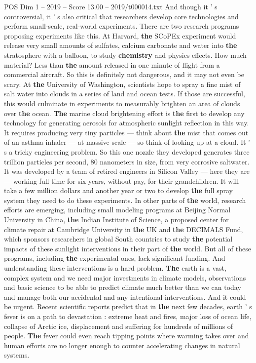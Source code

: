 \begin{textsample}{POS Dim 1 – 2019 – Score 13.00 – 2019/t000014.txt}
And though it ' s controversial, it ' s also critical that researchers develop core technologies and perform small-scale, real-world experiments.
There are two research programs proposing experiments like this.
At Harvard, \textbf{the} SCoPEx experiment would release very small amounts of sulfates, calcium carbonate and water into \textbf{the} stratosphere with a balloon, to study \textbf{chemistry} and physics effects.
How much material?
Less than \textbf{the} amount released in one minute of flight from a commercial aircraft.
So this is definitely not dangerous, and it may not even be scary.
At \textbf{the} University of Washington, scientists hope to spray a fine mist of salt water into clouds in a series of land and ocean tests.
If those are successful, this would culminate in experiments to measurably brighten an area of clouds over \textbf{the} ocean. \textbf{The} marine cloud brightening effort is \textbf{the} first to develop any technology for generating aerosols for atmospheric sunlight reflection in this way.
It requires producing very tiny particles — think about \textbf{the} mist that comes out of an asthma inhaler — at massive scale — so think of looking up at a cloud.
It ' s a tricky engineering problem.
So this one nozzle they developed generates three trillion particles per second, 80 nanometers in size, from very corrosive saltwater.
It was developed by a team of retired engineers in Silicon Valley — here they are — working full-time for six years, without pay, for their grandchildren.
It will take a few million dollars and another year or two to develop \textbf{the} full spray system they need to do these experiments.
In other parts of \textbf{the} world, research efforts are emerging, including small modeling programs at Beijing Normal University in China, \textbf{the} Indian Institute of Science, a proposed center for climate repair at Cambridge University in \textbf{the} UK and \textbf{the} DECIMALS Fund, which sponsors researchers in global South countries to study \textbf{the} potential impacts of these sunlight interventions in their part of \textbf{the} world.
But all of these programs, including \textbf{the} experimental ones, lack significant funding.
And understanding these interventions is a hard problem. \textbf{The} earth is a vast, complex system and we need major investments in climate models, observations and basic science to be able to predict climate much better than we can today and manage both our accidental and any intentional interventions.
And it could be urgent.
Recent scientific reports predict that in \textbf{the} next few decades, earth ' s fever is on a path to devastation : extreme heat and fires, major loss of ocean life, collapse of Arctic ice, displacement and suffering for hundreds of millions of people. \textbf{The} fever could even reach tipping points where warming takes over and human efforts are no longer enough to counter accelerating changes in natural systems.

\end{textsample}
